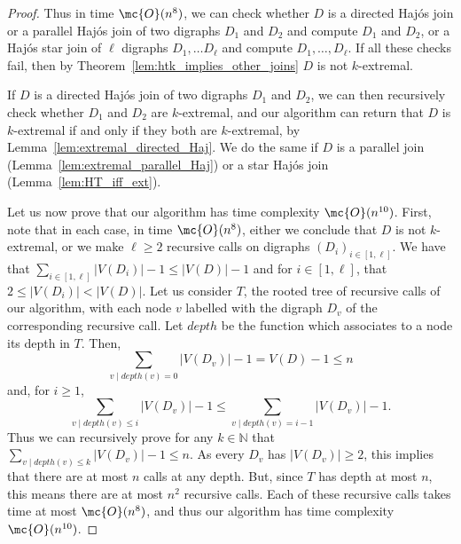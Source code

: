 \begin{proof}
    Thus in time $\mc{O}(n^8)$, we can check whether $D$ is a directed Haj\'os join or a parallel Haj\'os join of two digraphs $D_1$ and $D_2$ and compute $D_1$ and $D_2$, or a Haj\'os star join of $\ell$ digraphs $D_1, \dots D_{\ell}$ and compute $D_1, \dots, D_{\ell}$.
    If all these checks fail, then by Theorem~\ref{lem:htk_implies_other_joins} $D$ is not $k$-extremal.
    
    If $D$ is a directed Haj\'os join of two digraphs $D_1$ and $D_2$, we can then recursively check whether $D_1$ and $D_2$ are $k$-extremal, and our algorithm can return that $D$ is $k$-extremal if and only if they both are $k$-extremal,  by Lemma~\ref{lem:extremal_directed_Haj}. 
    We do the same if $D$ is a parallel join (Lemma~\ref{lem:extremal_parallel_Haj}) or a star Haj\'os join (Lemma~\ref{lem:HT_iff_ext}). 

    \medskip
    
    Let us now prove that our algorithm has time complexity $\mc{O}(n^{10})$. First, note that in each case, in time $\mc{O}(n^{8})$, either we conclude that $D$ is not $k$-extremal, or we make $\ell \geq 2$ recursive calls on digraphs $(D_i)_{i \in [1, \ell]}$. We have that $\sum_{i \in [1, \ell]} |V(D_i)| - 1 \leq |V(D)| - 1$ and for $i \in [1, \ell]$, that $2 \leq |V(D_i)| < |V(D)|$. Let us consider $T$, the rooted tree of recursive calls of our algorithm, with each node $v$ labelled with the digraph $D_v$ of the corresponding recursive call. Let $depth$ be the function which associates to a node its depth in $T$. Then, 
    $$\sum_{v \mid depth(v) = 0} |V(D_{v})| - 1 = V(D) - 1 \leq n$$ and, for $i \geq 1$, $$\sum_{v \mid depth(v) \leq i} |V(D_{v})| - 1 \leq \sum_{v \mid depth(v) = i - 1} |V(D_{v})| - 1.$$ Thus we can recursively prove for any $k \in \mathbb{N}$ that $\sum_{v \mid depth(v) \leq k} |V(D_{v})| - 1 \leq n$. As every $D_v$ has $|V(D_v)| \geq 2$, this implies that there are at most $n$ calls at any depth. But, since $T$ has depth at most $n$, this means there are at most $n^2$ recursive calls. Each of these recursive calls takes time at most $\mc{O}(n^8)$, and thus our algorithm has time complexity $\mc{O}(n^{10})$.
\end{proof}


